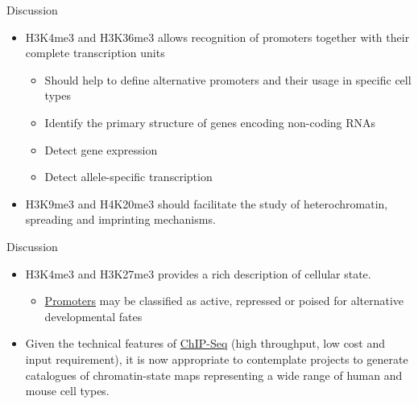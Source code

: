 \documentclass[bigger]{beamer}
\begin{document}
\begin{frame}[label={sec:orgddf2db2}]{Discussion}
\begin{itemize}
\item H3K4me3 and H3K36me3 allows recognition of promoters together with their
complete transcription units
\begin{itemize}
\item Should help to define alternative promoters and their usage in specific cell
types
\item Identify the primary structure of genes encoding non-coding RNAs
\item Detect gene expression
\item Detect allele-specific transcription
\end{itemize}

\item H3K9me3 and H4K20me3 should facilitate the study of heterochromatin, spreading
and imprinting mechanisms.
\end{itemize}
\end{frame}

\begin{frame}[label={sec:org945ee15}]{Discussion}
\begin{itemize}
\item H3K4me3 and H3K27me3 provides a rich description of cellular state.
\begin{itemize}
\item \href{../../concepts/biology/promoter.org}{Promoters} may be classified as active, repressed or poised for alternative
developmental fates
\end{itemize}

\item Given the technical features of \href{../../concepts/biology/sequencing/chip\_seq.org}{ChIP-Seq} (high throughput, low cost and input
requirement), it is now appropriate to contemplate projects to generate
catalogues of chromatin-state maps representing a wide range of human and
mouse cell types.
\end{itemize}
\end{frame}
\end{document}
